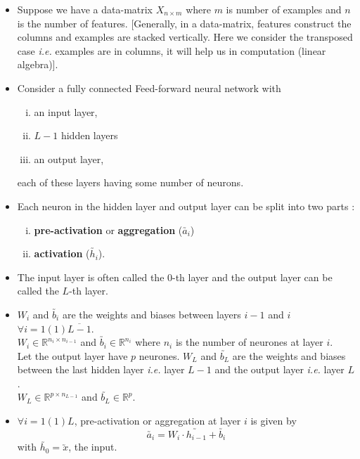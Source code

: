 \documentclass[11pt, a4paper]{article}
\begin{document}
\begin{itemize}

\item Suppose we have a data-matrix $X_{n \times m}$ where $m$ is number of examples and $n$ is the number of features. [Generally, in a data-matrix, features construct the columns and examples are stacked vertically. Here we consider the transposed case \textit{i.e.} examples are in columns, it will help us in computation (linear algebra)].

\item Consider a fully connected Feed-forward neural network with 
	\begin{enumerate}[(i)]
	\item an input layer,
	\item $L - 1$ hidden layers 
	\item an output layer,
	\end{enumerate}	
each of these layers having some number of neurons.

\item Each neuron in the hidden layer and output layer can be split into two parts : 
	\begin{enumerate}[(i)]
	\item \textbf{pre-activation} or \textbf{aggregation} ($\utilde{a_i}$)
	\item \textbf{activation} ($\utilde{h_i}$).
	\end{enumerate}
	
\item The input layer is often called the 0-th layer and the output layer can be called the $L$-th layer.

\item $W_i$ and $\utilde{b_i}$ are the weights and biases between layers $i-1$ and $i$ $\forall i = 1(1)\overline{L-1}$. \\

$W_i \in \mathbb{R}^{n_{i} \times n_{i-1}}$ and $\utilde{b_i} \in \mathbb{R}^{n_{i}}$ where $n_{i}$ is the number of neurones at layer $i$. \\

Let the output layer have $p$ neurones. $W_L$ and $\utilde{b_L}$ are the weights and biases between the last hidden layer \textit{i.e.} layer $L-1$ and the output layer \textit{i.e.} layer $L$. \\

$W_L \in \mathbb{R}^{p \times n_{L-1}}$ and $\utilde{b_L} \in \mathbb{R}^{p}$.

\item $\forall i = 1(1)L$, pre-activation or aggregation at layer $i$ is given by
	$$\utilde{a_i} = W_i \cdot \utilde{h_{i-1}} + \utilde{b_i}$$
with $\utilde{h_0} = \utilde{x}$, the input.
	

\end{itemize}
\end{document}
